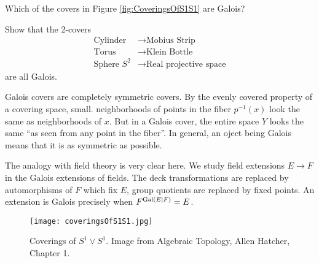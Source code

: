 \begin{qbox}
  Which of the covers in Figure \ref{fig:CoveringsOfS1S1} are Galois?
\end{qbox}
\begin{qbox}
  Show that the 2-covers
  \begin{align*}
    \mbox{Cylinder} &\longrightarrow \mbox{Mobius Strip} \\
    \mbox{Torus} &\longrightarrow \mbox{Klein Bottle} \\
    \mbox{Sphere } S^2 &\longrightarrow \mbox{Real projective space}
  \end{align*}
  are all Galois.
\end{qbox}

Galois covers are completely symmetric covers.
By the evenly covered property of a covering space, small. neighborhoods of points in the fiber $p^{-1}(x)$ look the same as neighborhoods of $x$.
But in a Galois cover, the entire space $Y$ looks the same ``as seen from any point in the fiber''.
In general, an oject being Galois means that it is as symmetric as possible.


\begin{remark}
  The analogy with field theory is very clear here.
  We study field extensions $E \rightarrow F$ in the Galois extensions of fields.
  The deck transformations are replaced by automorphisms of $F$ which fix $E$, group quotients are replaced by fixed points.
  An extension is Galois precisely when $F^{\operatorname{Gal}(E|F)} = E$.
\end{remark}






\begin{figure}[p]
\centering
  \texttt{[image: coveringsOfS1S1.jpg]}
  \caption*{Coverings of $S^1 \vee S^1$. Image from Algebraic Topology, Allen Hatcher, Chapter 1.}
\end{figure}

